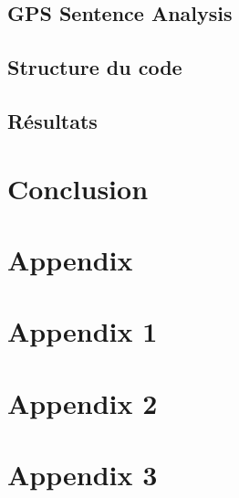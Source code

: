 \documentclass[12pt,fleqn]{report} %
\begin{document}
\section{GPS Sentence Analysis}

\section{Structure du code}

\section{Résultats}


\chapter*{Conclusion}


\appendix
\chapter*{Appendix}
\chapter{Appendix 1}
\chapter{Appendix 2}
\chapter{Appendix 3}

%


\nocite{*}

\end{document}
